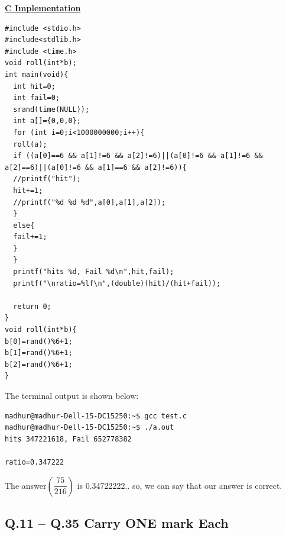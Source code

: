 \documentclass{article}
\begin{document}
\large\underline{\textbf{C Implementation}}\medskip\\
\begin{verbatim}
#include <stdio.h>
#include<stdlib.h>
#include <time.h>
void roll(int*b);
int main(void){
  int hit=0;
  int fail=0;
  srand(time(NULL));
  int a[]={0,0,0};
  for (int i=0;i<1000000000;i++){
  roll(a);
  if ((a[0]==6 && a[1]!=6 && a[2]!=6)||(a[0]!=6 && a[1]!=6 && a[2]==6)||(a[0]!=6 && a[1]==6 && a[2]!=6)){
  //printf("hit");
  hit+=1;
  //printf("%d %d %d",a[0],a[1],a[2]);
  }
  else{
  fail+=1;
  }
  }
  printf("hits %d, Fail %d\n",hit,fail);
  printf("\nratio=%lf\n",(double)(hit)/(hit+fail)); 
  
  return 0;
}
void roll(int*b){
b[0]=rand()%6+1;
b[1]=rand()%6+1;
b[2]=rand()%6+1;
}       
\end{verbatim}
\vspace{1cm}
The terminal output is shown below:\medskip\\
\begin{lstlisting}[style=terminal]
madhur@madhur-Dell-15-DC15250:~$ gcc test.c
madhur@madhur-Dell-15-DC15250:~$ ./a.out
hits 347221618, Fail 652778382

ratio=0.347222
\end{lstlisting}
The answer$\left(\dfrac{75}{216}\right)$ is 0.34722222.. so, we can say that our answer is correct.\\
 \subsection*{Q.11 – Q.35 Carry ONE mark Each}
 
\end{document}

